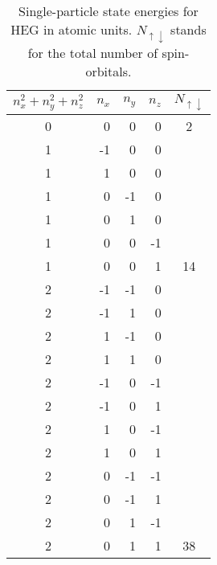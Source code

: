 \documentclass[twoside,english]{uiofysmaster}
\theoremstyle{definition}
\begin{document}
\begin{table}[!ht]
	\begin{center}
		\begin{tabular}{ |c | r | r | r | c|} 
			\hline
			$n_x^2+n_y^2+n_z^2$& $n_x$ & $n_y$ & $n_z$ & $N_{\uparrow \downarrow}$ \\
			\hline
			\hline
			0& 0  & 0  & 0  & 2 \\ \hline
			1& -1 & 0  & 0  &  \\ 
			1& 1  & 0  & 0  &  \\ 
			1& 0  & -1 & 0  &  \\ 
			1& 0  & 1  & 0  &  \\ 
			1& 0  & 0  & -1 &  \\ 
			1& 0  & 0  & 1  & 14 \\ 	\hline
			2& -1 & -1 & 0  &  \\ 
			2& -1 & 1  & 0  &  \\ 
			2& 1  & -1 & 0  &  \\ 
			2& 1  & 1  & 0  &  \\ 
			2& -1 & 0  & -1 &  \\ 
			2& -1 & 0  & 1  &  \\ 
			2& 1  & 0  & -1 &  \\ 
			2& 1  & 0  & 1  &  \\ 
			2& 0  & -1 & -1 &  \\ 
			2& 0  & -1 & 1  &  \\ 
			2& 0  & 1  & -1 &  \\ 
			2& 0  & 1  & 1  & 38 \\ 	\hline
		\end{tabular} 
		\caption{Single-particle state energies for HEG in atomic units. $N_{\uparrow \downarrow }$ stands for the total number of spin-orbitals.}
		\label{tab:spnumbers}
	\end{center}
\end{table}
\end{document}
